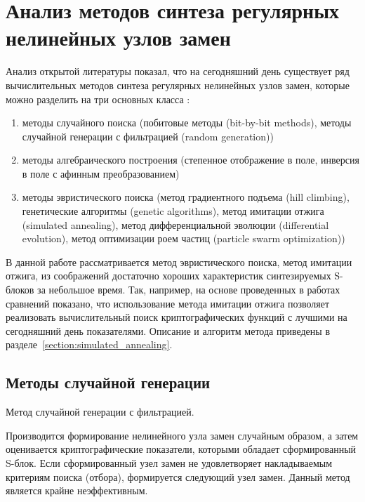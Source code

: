\chapter{Анализ методов синтеза регулярных нелинейных узлов замен}

Анализ открытой литературы показал, что на сегодняшний день существует ряд
вычислительных методов синтеза регулярных нелинейных узлов замен, которые можно
разделить на три основных класса \cite{Burnett,Connor,Millian1,Millian2,Clark1,Laskari,Tesar}:

\begin{enumerate}
    \item методы случайного поиска (побитовые методы (bit-by-bit methods),
        методы случайной генерации с фильтрацией (random generation))
    \item методы алгебраического построения (степенное отображение в поле,
        инверсия в поле с афинным преобразованием)
    \item методы эвристического поиска (метод градиентного подъема (hill climbing),
        генетические алгоритмы (genetic algorithms),
        метод имитации отжига (simulated annealing),
        метод дифференциальной эволюции (differential evolution),
        метод оптимизации роем частиц (particle swarm optimization))
\end{enumerate}

В данной работе рассматривается метод эвристического поиска, метод имитации
отжига, из соображений достаточно хороших характеристик синтезируемых S-блоков
за небольшое время. Так, например, на основе проведенных в работах
\cite{Clark1,Kavut} сравнений показано, что использование метода имитации отжига
позволяет реализовать вычислительный поиск криптографических функций с лучшими
на сегодняшний день показателями. Описание и алгоритм метода приведены в
разделе~\ref{section:simulated_annealing}.

\section{Методы случайной генерации}

Метод случайной генерации с фильтрацией.

Производится формирование нелинейного узла замен случайным образом, а затем
оценивается криптографические показатели, которыми обладает сформированный
S-блок. Если сформированный узел замен не удовлетворяет накладываемым критериям
поиска (отбора), формируется следующий узел замен. Данный метод является крайне
неэффективным.

